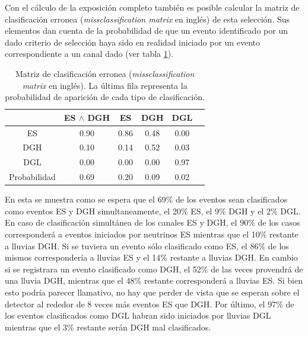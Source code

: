	
	Con el cálculo de la exposición completo también es posible calcular la matriz de clasificación erronea (\emph{missclassification matrix} en inglés) de esta selección.
	Sus elementos dan cuenta de la probabilidad de que un evento identificado por un dado criterio de selección haya sido en realidad iniciado por un evento correspondiente a un canal dado (ver tabla \ref{tab:missclass}).
	\begin{table}[ht!]
		\begin{center}
		\renewcommand{\arraystretch}{1.4}
			\begin{tabular}{|c|c|c|c|c|c|}
			\hline
			\diagbox{Lluvia}{Criterio} & ES $\wedge$ DGH &  ES    &  DGH   &  DGL      \\ \hline
			ES                         & 0.90            &  0.86  &  0.48  &  0.00     \\ \hline
			DGH                        & 0.10            &  0.14  &  0.52  &  0.03     \\ \hline
			DGL                        & 0.00            &  0.00  &  0.00  &  0.97     \\ \hline\hline
			Probabilidad               & 0.69            &  0.20  &  0.09  &  0.02     \\
			\hline
			\end{tabular}
		\end{center}
		\label{tab:missclass}
		\caption{Matriz de clasificación erronea (\emph{missclassification matrix} en inglés). La última fila representa la probabilidad de aparición de cada tipo de clasificación.}
	\end{table}
	En esta se muestra como se espera que el 69$\%$ de los eventos sean clasificados como eventos ES y DGH simultaneamente, el 20$\%$ ES, el 9$\%$ DGH y el 2$\%$ DGL.
	En caso de clasificación simultánea de los canales ES y DGH, el 90$\%$ de los casos corresponderá a eventos iniciados por neutrinos ES mientras que el 10$\%$ restante a lluvias DGH. 
	Si se tuviera un evento sólo clasificado como ES, el 86$\%$ de los mismos correspondería a lluvias ES y el 14$\%$ restante a lluvias DGH.
	En cambio si se registrara un evento clasificado como DGH, el 52$\%$ de las veces provendrá de una lluvia DGH, mientras que el 48$\%$ restante corresponderá a lluvias ES. 
	Si bien esto podría parecer llamativo, no hay que perder de vista que se esperan sobre el detector al rededor de 8 veces más eventos ES que DGH.
	Por último, el 97$\%$ de los eventos clasificados como DGL habran sido iniciados por lluvias DGL mientras que el 3$\%$ restante serán DGH mal clasificados.
	
